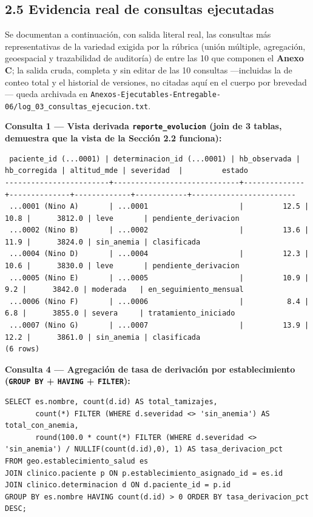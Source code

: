 \documentclass[11pt,a4paper]{article}
\begin{document}
\subsection{2.5 Evidencia real de consultas ejecutadas}\label{evidencia-real-de-consultas-ejecutadas}

Se documentan a continuación, con salida literal real, las consultas más representativas de la variedad exigida por la rúbrica (unión múltiple, agregación, geoespacial y trazabilidad de auditoría) de entre las 10 que componen el \textbf{Anexo C}; la salida cruda, completa y sin editar de las 10 consultas ---incluidas la de conteo total y el historial de versiones, no citadas aquí en el cuerpo por brevedad--- queda archivada en \texttt{Anexos-Ejecutables-Entregable-06/log\_03\_consultas\_ejecucion.txt}.

\textbf{Consulta 1 --- Vista derivada \texttt{reporte\_evolucion} (join de 3 tablas, demuestra que la vista de la Sección 2.2 funciona):}

\begin{samepage}\begin{verbatim}
 paciente_id (...0001) | determinacion_id (...0001) | hb_observada | hb_corregida | altitud_mde | severidad  |         estado
------------------------+-----------------------------+--------------+--------------+-------------+------------+------------------------
 ...0001 (Nino A)       | ...0001                     |         12.5 |         10.8 |      3812.0 | leve       | pendiente_derivacion
 ...0002 (Nino B)       | ...0002                     |         13.6 |         11.9 |      3824.0 | sin_anemia | clasificada
 ...0004 (Nino D)       | ...0004                     |         12.3 |         10.6 |      3830.0 | leve       | pendiente_derivacion
 ...0005 (Nino E)       | ...0005                     |         10.9 |          9.2 |      3842.0 | moderada   | en_seguimiento_mensual
 ...0006 (Nino F)       | ...0006                     |          8.4 |          6.8 |      3855.0 | severa     | tratamiento_iniciado
 ...0007 (Nino G)       | ...0007                     |         13.9 |         12.2 |      3861.0 | sin_anemia | clasificada
(6 rows)
\end{verbatim}\end{samepage}

\textbf{Consulta 4 --- Agregación de tasa de derivación por establecimiento (\texttt{GROUP\ BY} + \texttt{HAVING} + \texttt{FILTER}):}

\begin{samepage}\begin{verbatim}
SELECT es.nombre, count(d.id) AS total_tamizajes,
       count(*) FILTER (WHERE d.severidad <> 'sin_anemia') AS total_con_anemia,
       round(100.0 * count(*) FILTER (WHERE d.severidad <> 'sin_anemia') / NULLIF(count(d.id),0), 1) AS tasa_derivacion_pct
FROM geo.establecimiento_salud es
JOIN clinico.paciente p ON p.establecimiento_asignado_id = es.id
JOIN clinico.determinacion d ON d.paciente_id = p.id
GROUP BY es.nombre HAVING count(d.id) > 0 ORDER BY tasa_derivacion_pct DESC;
\end{verbatim}\end{samepage}
\end{document}
